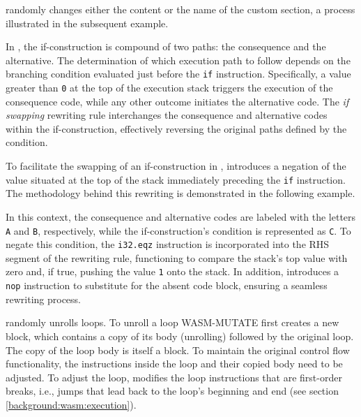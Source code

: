 


 \tool randomly changes either the content or the name of the custom section, a process illustrated in the subsequent example.




 In \Wasm, the if-construction is compound of two paths: the consequence and the alternative. 
The determination of which execution path to follow depends on the branching condition evaluated just before the \texttt{if} instruction. 
Specifically, a value greater than \texttt{0} at the top of the execution stack triggers the execution of the consequence code, while any other outcome initiates the alternative code.
The \emph{if swapping} rewriting rule interchanges the consequence and alternative codes within the if-construction, effectively reversing the original paths defined by the condition.



To facilitate the swapping of an if-construction in \Wasm, \tool introduces a negation of the value situated at the top of the stack immediately preceding the \texttt{if} instruction. 
The methodology behind this rewriting is demonstrated in the following example.




In this context, the consequence and alternative codes are labeled with the letters \texttt{A} and \texttt{B}, respectively, while the if-construction's condition is represented as \texttt{C}. 
To negate this condition, the \texttt{i32.eqz} instruction is incorporated into the RHS segment of the rewriting rule, functioning to compare the stack's top value with zero and, if true, pushing the value \texttt{1} onto the stack.
In addition, \tool introduces a \texttt{nop} instruction to substitute for the absent code block, ensuring a seamless rewriting process.


 \tool randomly unrolls loops.
To unroll a loop WASM-MUTATE first creates a new \wasm block, which contains a copy of its body (unrolling) followed by the original loop.
The copy of the loop body is itself a \wasm block.
To maintain the original control flow functionality, the instructions inside the loop and their copied body need to be adjusted.
To adjust the loop, \tool modifies the loop instructions that are first-order breaks, i.e., jumps that lead back to the loop's beginning and end (see section \autoref{background:wasm:execution}). 

